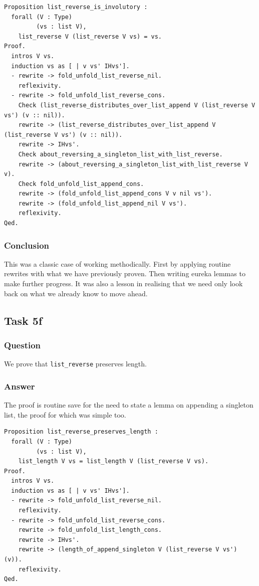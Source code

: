 \documentclass{article}
\begin{document}
\begin{lstlisting}
Proposition list_reverse_is_involutory :
  forall (V : Type)
         (vs : list V),
    list_reverse V (list_reverse V vs) = vs.
Proof.
  intros V vs.
  induction vs as [ | v vs' IHvs'].
  - rewrite -> fold_unfold_list_reverse_nil.
    reflexivity.
  - rewrite -> fold_unfold_list_reverse_cons.
    Check (list_reverse_distributes_over_list_append V (list_reverse V vs') (v :: nil)).
    rewrite -> (list_reverse_distributes_over_list_append V (list_reverse V vs') (v :: nil)).
    rewrite -> IHvs'.
    Check about_reversing_a_singleton_list_with_list_reverse.
    rewrite -> (about_reversing_a_singleton_list_with_list_reverse V v).
    Check fold_unfold_list_append_cons.
    rewrite -> (fold_unfold_list_append_cons V v nil vs').
    rewrite -> (fold_unfold_list_append_nil V vs'). 
    reflexivity.
Qed.
\end{lstlisting}

\subsubsection{Conclusion}
This was a classic case of working methodically. First by applying routine rewrites with what we have previously proven. Then writing eureka lemmas to make further progress. It was also a lesson in realising that we need only look back on what we already know to move ahead. 
 
\subsection{Task 5f}

\subsubsection{Question}
We prove that \texttt{list\_reverse} preserves length.

\subsubsection{Answer}
The proof is routine save for the need to state a lemma on appending a singleton list, the proof for which was simple too. 

\begin{lstlisting}
Proposition list_reverse_preserves_length :
  forall (V : Type)
         (vs : list V),
    list_length V vs = list_length V (list_reverse V vs).
Proof.
  intros V vs.
  induction vs as [ | v vs' IHvs'].
  - rewrite -> fold_unfold_list_reverse_nil.
    reflexivity.
  - rewrite -> fold_unfold_list_reverse_cons.
    rewrite -> fold_unfold_list_length_cons.
    rewrite -> IHvs'.
    rewrite -> (length_of_append_singleton V (list_reverse V vs') (v)).
    reflexivity.
Qed.
\end{lstlisting}
\end{document}
